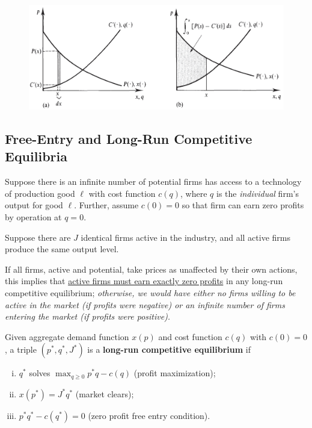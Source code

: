 \documentclass{report}
\begin{document}
		\begin{figure}[h]
			\centering
			\includegraphics[width=0.5\linewidth]{figures/agg_surplus}
		\end{figure}
		
		\begin{example}
			
		\end{example}
		
		\subsection{Free-Entry and Long-Run Competitive Equilibria}
		\begin{assumption}
			Suppose there is an infinite number of potential firms has access to a technology of production good $\ell$ with cost function $c(q)$, where $q$ is the \emph{individual} firm's output for good $\ell$. Further, assume $c(0) = 0$ so that firm can earn zero profits by operation at $q=0$.
		\end{assumption}
		
		\begin{assumption}
			Suppose there are $J$ identical firms active in the industry, and all active firms produce the same output level.
		\end{assumption}
		
		\begin{proposition}
			If all firms, active and potential, take prices as unaffected by their own actions, this implies that \ul{active firms must earn exactly zero profits} in any long-run competitive equilibrium; \emph{otherwise, we would have either no firms willing to be active in the market (if profits were negative) or an infinite number of firms entering the market (if profits were positive).}
		\end{proposition}
		
		\begin{definition}[10.F.1]
			Given aggregate demand function $x(p)$ and cost function $c(q)$ with $c(0) = 0$, a triple $(p^*, q^*, J^*)$ is a \textbf{long-run competitive equilibrium} if
			\begin{enumerate}[(i)]
				\item $q^*$ solves $\max_{q \geq 0} p^* q - c(q)$ (profit maximization);
				\item $x(p^*) = J^* q^*$ (market clears);
				\item $p^* q^* - c(q^*) = 0$ (zero profit free entry condition).
			\end{enumerate}
		\end{definition}
		
\end{document}
